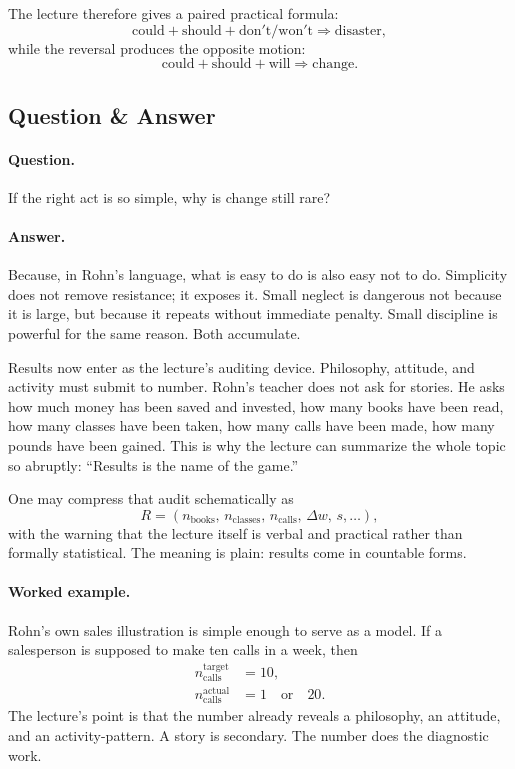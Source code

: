 The lecture therefore gives a paired practical formula:
\begin{equation}
\mathrm{could}+\mathrm{should}+\mathrm{don't/won't}\Rightarrow \mathrm{disaster},
\end{equation}
while the reversal produces the opposite motion:
\begin{equation}
\mathrm{could}+\mathrm{should}+\mathrm{will}\Rightarrow \mathrm{change}.
\end{equation}

\subsection{Question \& Answer}

\paragraph{Question.} If the right act is so simple, why is change still rare?

\paragraph{Answer.} Because, in Rohn's language, what is easy to do is also easy not to do. Simplicity does not remove resistance; it exposes it. Small neglect is dangerous not because it is large, but because it repeats without immediate penalty. Small discipline is powerful for the same reason. Both accumulate.

Results now enter as the lecture's auditing device. Philosophy, attitude, and activity must submit to number. Rohn's teacher does not ask for stories. He asks how much money has been saved and invested, how many books have been read, how many classes have been taken, how many calls have been made, how many pounds have been gained. This is why the lecture can summarize the whole topic so abruptly: ``Results is the name of the game.''

One may compress that audit schematically as
\begin{equation}
R=(n_{\text{books}},\, n_{\text{classes}},\, n_{\text{calls}},\, \Delta w,\, s,\dots),
\end{equation}
with the warning that the lecture itself is verbal and practical rather than formally statistical. The meaning is plain: results come in countable forms.

\paragraph{Worked example.} Rohn's own sales illustration is simple enough to serve as a model. If a salesperson is supposed to make ten calls in a week, then
\begin{align}
n_{\text{calls}}^{\text{target}} &= 10,\\
n_{\text{calls}}^{\text{actual}} &= 1 \quad \text{or} \quad 20.
\end{align}
The lecture's point is that the number already reveals a philosophy, an attitude, and an activity-pattern. A story is secondary. The number does the diagnostic work.

